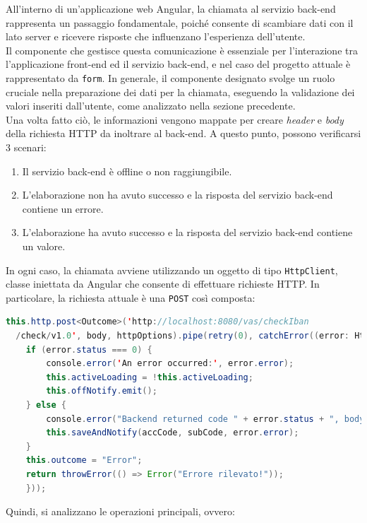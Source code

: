 All’interno di un’applicazione web Angular, la chiamata al servizio back-end rappresenta un passaggio fondamentale, poiché consente di scambiare dati con il lato server e ricevere risposte che influenzano l’esperienza dell’utente.\\
Il componente che gestisce questa comunicazione è essenziale per l’interazione tra l’applicazione front-end ed il servizio back-end, e nel caso del progetto attuale è rappresentato da \texttt{form}. In generale, il componente designato svolge un ruolo cruciale nella preparazione dei dati per la chiamata, eseguendo la validazione dei valori inseriti dall’utente, come analizzato nella sezione precedente.\\
Una volta fatto ciò, le informazioni vengono mappate per creare \textit{header} e \textit{body} della richiesta HTTP da inoltrare al back-end. A questo punto, possono verificarsi 3 scenari:
\begin{enumerate}
    \item Il servizio back-end è offline o non raggiungibile.
    \item L’elaborazione non ha avuto successo e la risposta del servizio back-end contiene un errore.
    \item L’elaborazione ha avuto successo e la risposta del servizio back-end contiene un valore.
\end{enumerate}
In ogni caso, la chiamata avviene utilizzando un oggetto di tipo \texttt{HttpClient}, classe iniettata da Angular che consente di effettuare richieste HTTP. In particolare, la richiesta attuale è una \texttt{POST} così composta:
\begin{lstlisting}[language=Java, caption=Codice TypeScript per la preparazione di una chiamata su protocollo HTTP.]
this.http.post<Outcome>('http://localhost:8080/vas/checkIban
  /check/v1.0', body, httpOptions).pipe(retry(0), catchError((error: HttpErrorResponse) => {
    if (error.status === 0) {
        console.error('An error occurred:', error.error);
        this.activeLoading = !this.activeLoading;
        this.offNotify.emit();
    } else {
        console.error("Backend returned code " + error.status + ", body was: ", error.error);
        this.saveAndNotify(accCode, subCode, error.error);
    }    
    this.outcome = "Error";
    return throwError(() => Error("Errore rilevato!"));
    }));
\end{lstlisting}
Quindi, si analizzano le operazioni principali, ovvero:
